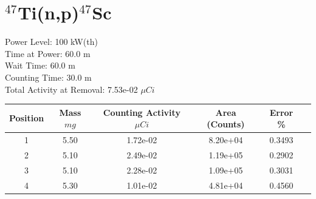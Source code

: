 \newpage

\section*{ $^{47}$Ti(n,p)$^{47}$Sc }

Power Level: 100 kW(th) \\
Time at Power: 60.0 m \\
Wait Time: 60.0 m \\
Counting Time: 30.0 m \\
Total Activity at Removal: 7.53e-02 $\mu Ci$

\begin{table}[h]
\centering
\begin{tabular}{ |c|c|c|c|c|c| }
 \hline
 Position & Mass $mg$ & Counting Activity $\mu Ci$ & Area (Counts) & Error \% \\
 \hline 
 1 & 5.50 & 1.72e-02 & 8.20e+04 & 0.3493 \\ 
\hline
 2 & 5.10 & 2.49e-02 & 1.19e+05 & 0.2902 \\ 
\hline
 3 & 5.10 & 2.28e-02 & 1.09e+05 & 0.3031 \\ 
\hline
 4 & 5.30 & 1.01e-02 & 4.81e+04 & 0.4560 \\ 
\hline
\end{tabular}
\end{table}

